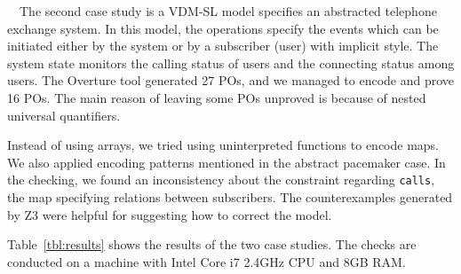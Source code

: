  ~~The second case study is a VDM-SL model specifies an abstracted telephone exchange system. In this model, the operations specify the events which can be initiated either by the system or by a subscriber (user) with implicit style. The system state monitors the calling status of users and the connecting status among users. The Overture tool generated 27 POs, and we managed to encode and prove 16 POs. The main reason of leaving some POs unproved is because of nested universal quantifiers.

Instead of using arrays, we tried using uninterpreted functions to encode maps. We also applied encoding patterns mentioned in the abstract pacemaker case. In the checking, we found an inconsistency about the constraint regarding {\tt calls}, the map specifying relations between subscribers. The counterexamples generated by Z3 were helpful for suggesting how to correct the model.

Table~\ref{tbl:results} shows the results of the two case studies. The checks are conducted on a machine with Intel Core i7 2.4GHz CPU and 8GB RAM.

